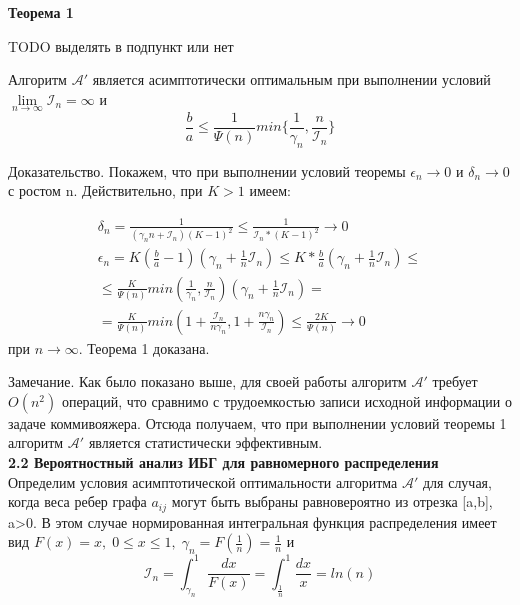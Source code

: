 \documentclass[a4paper, 14pt]{extarticle}
\begin{document}
\textbf{Теорема 1}

TODO выделять в подпункт или нет

Алгоритм $\mathcal{A'}$ является асимптотически оптимальным при выполнении условий $\lim\limits_{{n} \to \infty} \mathcal{I}_n = \infty $ и 
\begin{equation}
\frac{b}{a} \leq \frac{1}{\Psi(n)} min \{ \frac{1}{\gamma_n}, \frac{n}{\mathcal{I}_n} \}
\end{equation}

Доказательство. Покажем, что при выполнении условий теоремы $\epsilon_n \to 0$ и $\delta_n \to 0$ с ростом n. Действительно, при $K>1$ имеем:

\begin{equation}
\begin{aligned}
\delta_n = \frac{1}{(\gamma_n n+\mathcal{I}_n)(K-1)^2} \leq \frac{1}{\mathcal{I}_n * (K-1)^2} \to 0 \\
\epsilon_n = K(\frac{b}{a}-1)(\gamma_n+\frac{1}{n} \mathcal{I}_n) \leq K*\frac{b}{a} (\gamma_n+\frac{1}{n} \mathcal{I}_n)\leq \\
\leq \frac{K}{\Psi(n)} min(\frac{1}{\gamma_n}, \frac{n}{\mathcal{I}_n})(\gamma_n+\frac{1}{n} \mathcal{I}_n) = \\
= \frac{K}{\Psi(n)} min (1+\frac{\mathcal{I}_n}{n \gamma_n}, 1+\frac{n \gamma_n}{\mathcal{I}_n}) \leq \frac{2K}{\Psi(n)} \to 0
\end{aligned}
\end{equation}
при $n \to \infty$. Теорема 1 доказана.

Замечание. Как было показано выше, для своей работы алгоритм $\mathcal{A'}$ требует $O(n^2)$ операций, что сравнимо с трудоемкостью записи исходной информации о задаче коммивояжера. Отсюда получаем, что при выполнении условий теоремы 1 алгоритм $\mathcal{A'}$ является статистически эффективным.\\

\textbf{2.2 Вероятностный анализ ИБГ для равномерного распределения}\\

Определим условия асимптотической оптимальности алгоритма $\mathcal{A'}$ для случая, когда веса ребер графа $a_{ij}$ могут быть выбраны равновероятно из отрезка [a,b], a>0. В этом случае нормированная интегральная функция распределения имеет вид $F(x) = x,\; 0 \leq x \leq 1,\; \gamma_n = F(\frac{1}{n}) = \frac{1}{n}$ и
\begin{equation}
\mathcal{I}_n = \int_{\gamma_n}^1 \frac{dx}{F(x)} = \int_{\frac{1}{n}}^1 \frac{dx}{x} = ln(n)
\end{equation}
\end{document}
